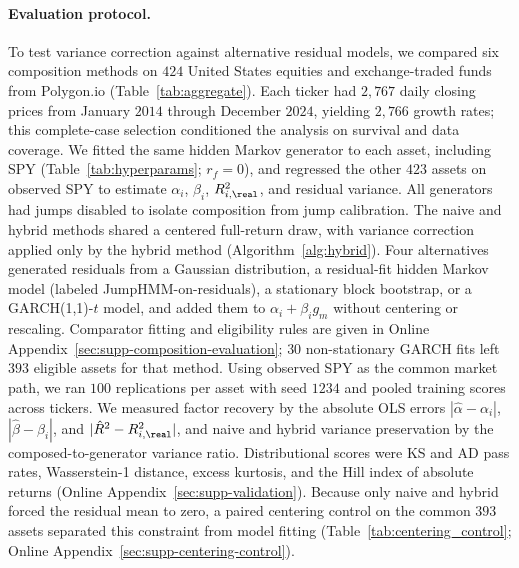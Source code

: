 \paragraph{Evaluation protocol.}

To test variance correction against alternative residual models, we
compared six composition methods on $424$ United States equities and
exchange-traded funds from Polygon.io (Table~\ref{tab:aggregate}).
Each ticker had $2{,}767$ daily closing prices from January $2014$
through December $2024$, yielding $2{,}766$ growth rates; this
complete-case selection conditioned the analysis on survival and data
coverage. We fitted the same hidden Markov generator to each asset,
including SPY (Table~\ref{tab:hyperparams}; $r_f=0$), and regressed
the other $423$ assets on observed SPY to estimate $\alpha_i$,
$\beta_i$, $R^2_{i,\real}$, and residual variance. All generators
had jumps disabled to isolate composition from jump calibration. The
naive and hybrid methods shared a centered full-return draw, with
variance correction applied only by the hybrid method
(Algorithm~\ref{alg:hybrid}). Four alternatives generated residuals
from a Gaussian distribution, a residual-fit hidden Markov model
(labeled JumpHMM-on-residuals), a stationary block bootstrap, or a
GARCH(1,1)-$t$ model, and added them to $\alpha_i+\beta_i g_m$
without centering or rescaling. Comparator fitting and eligibility
rules are given in Online Appendix~\ref{sec:supp-composition-evaluation};
$30$ non-stationary GARCH fits left $393$ eligible assets for that
method. Using observed SPY as the common market path, we ran $100$
replications per asset with seed $1234$ and pooled training scores
across tickers. We measured factor recovery by the absolute OLS
errors $|\hat\alpha-\alpha_i|$, $|\hat\beta-\beta_i|$, and
$|\hat R^2-R^2_{i,\real}|$, and naive and hybrid variance preservation
by the composed-to-generator variance ratio. Distributional scores
were KS and AD pass rates, Wasserstein-1 distance, excess kurtosis,
and the Hill index of absolute returns (Online
Appendix~\ref{sec:supp-validation}). Because only naive and hybrid
forced the residual mean to zero, a paired centering control on the
common $393$ assets separated this constraint from model fitting
(Table~\ref{tab:centering_control}; Online
Appendix~\ref{sec:supp-centering-control}).

